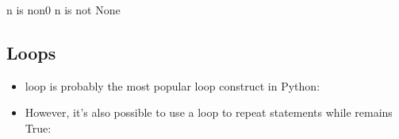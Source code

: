 \documentclass[letterpaper,10pt,english]{sphinxmanual}
\begin{document}
\begin{sphinxVerbatim}[commandchars=\\\{\}]
  

 

   
    
    
\end{sphinxVerbatim}

\begin{sphinxVerbatim}[commandchars=\\\{\}]
n is non\PYGZhy{}0
n is not None
\end{sphinxVerbatim}


\subsection{Loops}
\label{\detokenize{content/Introduction_to_Programming:loops}}\begin{itemize}
\item {} 
 loop is probably the most popular loop construct in Python:

\end{itemize}

\begin{sphinxVerbatim}[commandchars=\\\{\}]
   
\end{sphinxVerbatim}
\begin{itemize}
\item {} 
However, it’s also possible to use a  loop to repeat statements while  remains True:

\end{itemize}

\begin{sphinxVerbatim}[commandchars=\\\{\}]
  
\end{sphinxVerbatim}
\end{document}

